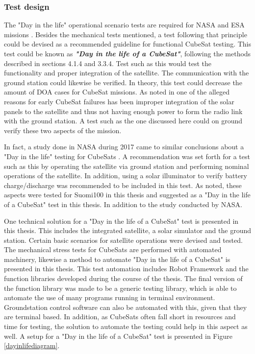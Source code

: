 \documentclass[english,12pt,a4paper,pdftex,elec,utf8]{aaltothesis}
\begin{document}
\subsubsection{Test design}
The "Day in the life" operational scenario tests are required for NASA and ESA missions \cite{tor}. Besides the mechanical tests mentioned, a test following that principle could be devised as a recommended guideline for functional CubeSat testing. This test could be known as \textbf{\textit{"Day in the life of a CubeSat"}}, following the methods described in sections 4.1.4 and 3.3.4. Test such as this would test the functionality and proper integration of the satellite. The communication with the ground station could likewise be verified. In theory, this test could decrease the amount of DOA cases for CubeSat missions. As noted in \cite{Langer, Swart1} one of the alleged reasons for early CubeSat failures has been improper integration of the solar panels to the satellite and thus not having enough power to form the radio link with the ground station. A test such as the one discussed here could on ground verify these two aspects of the mission.\par
In fact, a study done in NASA during 2017 came to similar conclusions about a "Day in the life" testing for CubeSats \cite{improvingcubesatsuccess}. A recommendation was set forth for a test such as this by operating the satellite via ground station and performing nominal operations of the satellite. In addition, using a solar illuminator to verify battery charge/discharge was recommended to be included in this test. As noted, these aspects were tested for Suomi100 in this thesis and suggested as a "Day in the life of a CubeSat" test in this thesis. In addition to the study conducted by NASA.\par  
One technical solution for a "Day in the life of a CubeSat" test is presented in this thesis. This includes the integrated satellite, a solar simulator and the ground station. Certain basic scenarios for satellite operations were devised and tested. The mechanical stress tests for CubeSats are performed with automated machinery, likewise a method to automate "Day in the life of a CubeSat" is presented in this thesis. This test automation includes Robot Framework and the function libraries developed during the course of the thesis. The final version of the function library was made to be a generic testing library, which is able to automate the use of many programs running in terminal environment. Groundstation control software can also be automated with this, given that they are terminal based. In addition, as CubeSats often fall short in resources and time for testing, the solution to automate the testing could help in this aspect as well. A setup for a "Day in the life of a CubeSat" test is presented in Figure \ref{dayinlifediagram}.\par
\end{document}
